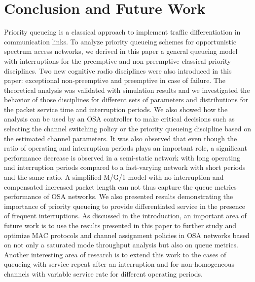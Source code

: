 \documentclass[11pt,journal,oneside,onecolumn,draftclsnofoot]{IEEEtran}
\begin{document}
\normalsize


\section{Conclusion and Future Work}
\label{eq:conclusion}
Priority queueing is a classical approach to implement traffic differentiation in communication links. To analyze priority queueing schemes for opportunistic spectrum access networks, we derived in this paper a general queueing model
with interruptions for the preemptive and non-preemptive classical priority
disciplines. Two new cognitive radio disciplines were also introduced in this paper: exceptional non-preemptive and  preemptive in case of failure. The theoretical analysis was validated with simulation results and we investigated the behavior of those disciplines for different sets of parameters and distributions for the packet service time and interruption periods. We also showed how the analysis can be used by an OSA controller to make critical decisions such as selecting the channel switching policy or the priority queueing discipline based on the estimated channel parameters. It was also observed that even though the ratio of operating and interruption periods plays an important role, a significant performance decrease is observed in a semi-static network with long operating and interruption periods compared to a fast-varying network with short periods and the same ratio. A simplified M/G/1 model with no interruption and compensated increased packet length can not thus capture the queue metrics performance of OSA networks. We also presented results demonstrating the importance of priority queueing to provide differentiated service in the presence of frequent interruptions. 
As discussed in the introduction, an important area of future work is to use the results presented in this paper to further study and optimize MAC protocols and channel assignment policies in OSA networks based on not only a saturated mode throughput analysis but also on queue metrics.
Another interesting area of research is to extend this work to the cases of queueing with service repeat after an interruption and for non-homogeneous channels with variable service rate for different operating periods.









\end{document}
